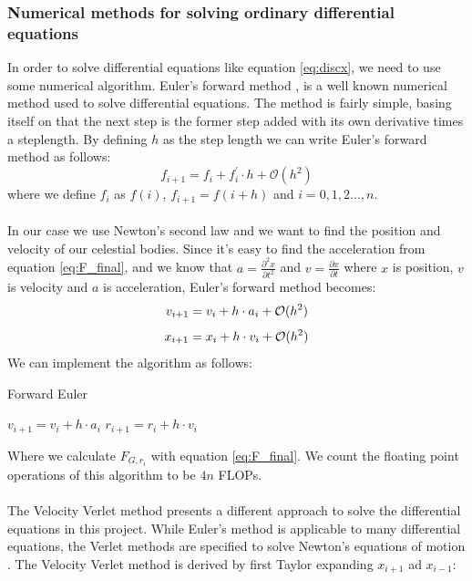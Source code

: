 \documentclass{article}
\begin{document}
\subsubsection{Numerical methods for solving ordinary differential equations}
In order to solve differential equations like equation \eqref{eq:discx}, we need to use some numerical algorithm. Euler's forward method \cite{Euler}, is a well known numerical method used to solve differential equations. The method is fairly simple, basing itself on that the next step is the former step added with its own derivative times a steplength. By defining $h$ as the step length we can write Euler's forward method as follows:
\begin{equation}
f_{i + 1} = f_i + f^{'}_i \cdot h + \mathcal{O}(h^2)
\label{eq:fwdEuler}
\end{equation}
where we define $f_i$ as $f(i)$, $f_{i+1} = f(i + h)$ and $i = 0, 1, 2 ... , n$. \\\\
In our case we use Newton's second law and we want to find the position and velocity of our celestial bodies. Since it's easy to find the acceleration from equation \eqref{eq:F_final}, and we know that $a = \frac{\partial^2 x}{\partial t^2}$ and $v = \frac{\partial x}{\partial t}$ where $x$ is position, $v$ is velocity and $a$ is acceleration, Euler's forward method becomes:
\begin{equation}
v_{i + 1} = v_i + h \cdot a_i + \mathcal{O}(h^2)\\
\label{eq:Eulervel}
\end{equation}
\begin{equation}
x_{i + 1} = x_i + h \cdot v_i + \mathcal{O}(h^2)\\
\label{eq:Eulerpos}
\end{equation}
We can implement the algorithm as follows:
\begin{algorithm}[H]
\small
\caption{Forward Euler}\label{alg:VelVerlet}
\begin{algorithmic}[1]
\State $v_{i+1} = v_i + h\cdot a_i $
\State $r_{i+1} = r_i + h\cdot v_i $
\EndFor
\end{algorithmic}
\end{algorithm}
Where we calculate $F_{G, r_i}$ with equation \eqref{eq:F_final}. We count the floating point operations of this algorithm to be $4n$ FLOPs. \\ \\
The Velocity Verlet method presents a different approach to solve the differential equations in this project. While Euler's method is applicable to many differential equations, the Verlet methods are specified to solve Newton's equations of motion \cite{Newton}. The Velocity Verlet method is derived by first Taylor expanding $x_{i + 1}$ ad $x_{i-1}$:
\end{document}
